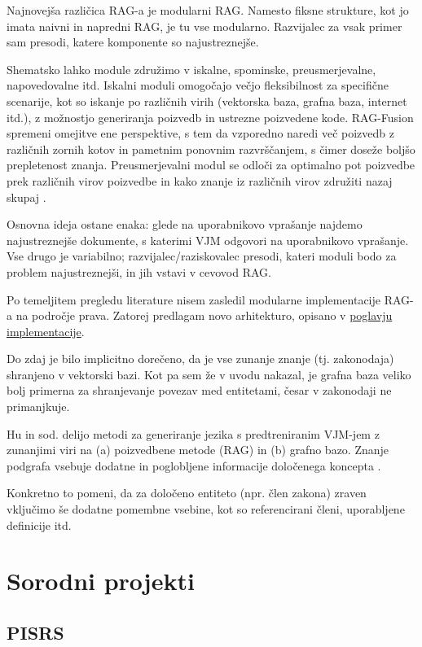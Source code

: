 \documentclass[a4paper,12pt,openright]{book}
\begin{document}
Najnovejša različica RAG-a je modularni RAG. Namesto fiksne strukture, kot jo imata naivni in napredni RAG, je tu vse modularno. Razvijalec za vsak primer sam presodi, katere komponente so najustreznejše.

Shematsko lahko module združimo v iskalne, spominske, preusmerjevalne, napovedovalne itd. Iskalni moduli omogočajo večjo fleksibilnost za specifične scenarije, kot so iskanje po različnih virih (vektorska baza, grafna baza, internet itd.), z možnostjo generiranja poizvedb in ustrezne poizvedene kode. RAG-Fusion spremeni omejitve ene perspektive, s tem da vzporedno naredi več poizvedb z različnih zornih kotov in pametnim ponovnim razvrščanjem, s čimer doseže boljšo prepletenost znanja. Preusmerjevalni modul se odloči za optimalno pot poizvedbe prek različnih virov poizvedbe in kako znanje iz različnih virov združiti nazaj skupaj \cite{rag_survey}.

Osnovna ideja ostane enaka: glede na uporabnikovo vprašanje najdemo najustreznejše dokumente, s katerimi VJM odgovori na uporabnikovo vprašanje. Vse drugo je variabilno; razvijalec/raziskovalec presodi, kateri moduli bodo za problem najustreznejši, in jih vstavi v cevovod RAG.

Po temeljitem pregledu literature nisem zasledil modularne implementacije RAG-a na področje prava. Zatorej predlagam novo arhitekturo, opisano v \hyperref[llm_kg_rag]{poglavju implementacije}.

Do zdaj je bilo implicitno dorečeno, da je vse zunanje znanje (tj. zakonodaja) shranjeno v vektorski bazi. Kot pa sem že v uvodu nakazal, je grafna baza veliko bolj primerna za shranjevanje povezav med entitetami, česar v zakonodaji ne primanjkuje.

Hu in sod. delijo metodi za generiranje jezika s predtreniranim VJM-jem z zunanjimi viri na (a) poizvedbene metode (RAG) in (b) grafno bazo. Znanje podgrafa vsebuje dodatne in poglobljene informacije določenega koncepta \cite{hu_survey}.

Konkretno to pomeni, da za določeno entiteto (npr. člen zakona) zraven vključimo še dodatne pomembne vsebine, kot so referencirani členi, uporabljene definicije itd.

\section{Sorodni projekti}

\subsection{PISRS}
\end{document}

